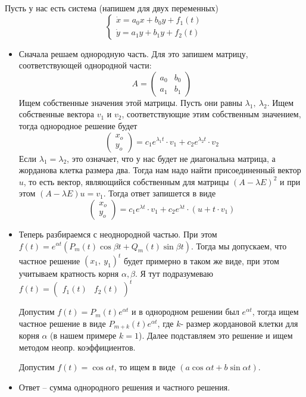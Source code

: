 \documentclass[11pt]{article}
\begin{document}
	Пусть у нас есть система (напишем для двух переменных)
	$$\begin{cases}
		\dot{x} = a_0x + b_0y + f_1(t) \\
		\dot{y} = a_1y + b_1y + f_2(t)
	\end{cases}$$
	\begin{itemize}
		\item Сначала решаем однородную часть. Для это запишем матрицу, соответствующей однородной части:
		$$A = \begin{pmatrix}
			a_0 & b_0 \\
			a_1 & b_1
		\end{pmatrix}$$
		Ищем собственные значения этой матрицы. Пусть они равны $\lambda_1, \ \lambda_2$. Ищем собственные вектора $v_1$ и $v_2$, соответствующие этим собственным 
		значением, тогда однородное решение будет
		$$\begin{pmatrix}
			x_o \\ y_o
		\end{pmatrix} = c_1e^{\lambda_1t}\cdot v_1 + c_2e^{\lambda_2t}\cdot v_2$$
		Если $\lambda_1 = \lambda_2$, это означает, что у нас будет не диагональна матрица, а жорданова клетка размера два. Тогда
		нам надо найти присоединенный вектор $u$, то есть вектор, являющийся собственным для матрицы $(A - \lambda E)^2$ и при этом
		$(A - \lambda E)u = v_1$. Тогда ответ запишется в виде 
		$$\begin{pmatrix}
			x_o \\ y_o
		\end{pmatrix} = c_1e^{\lambda t}\cdot v_1 + c_2e^{\lambda t}\cdot (u + t \cdot v_1)$$

		\item Теперь разбираемся с неоднородной частью. При этом $f(t) = e^{\alpha t}(P_m(t)\cos \beta t + Q_m(t)\sin \beta t)$. 
		Тогда мы допускаем, что частное решение $(x_1, \ y_1)^t$ будет примерно в таком же виде, при этом учитываем кратность корня $\alpha, \beta$. Я тут подразумеваю $f(t) = \begin{pmatrix}
			f_1(t) & f_2(t)
		\end{pmatrix}^t$

		Допустим $f(t) = P_m(t)e^{\alpha t}$ и в однородном решении был $e^{\alpha t}$, тогда ищем частное решение в виде $P_{m + k}(t)e^{\alpha t}$, где $k$- размер жордановой
		клетки для корня $\alpha$ (в нашем примере $k = 1$). Далее подставляем это решение и ищем методом неопр. коэффициентов.

		Допустим $f(t) = \cos \alpha t$, то ищем в виде $(a \cos \alpha t + b \sin \alpha t)$. 

		\item Ответ -- сумма однородного решения и частного решения.
	\end{itemize}
	
	
	
\end{document}
